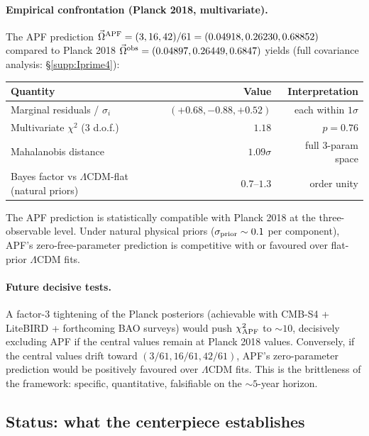 \documentclass[11pt]{article}
\theoremstyle{plain}
\theoremstyle{definition}
\theoremstyle{remark}
\begin{document}
\paragraph{Empirical confrontation (Planck 2018, multivariate).}  The APF prediction $\vec{\Omega}^{\rm APF} = (3, 16, 42)/61 = (0.04918, 0.26230, 0.68852)$ compared to Planck 2018 $\vec{\Omega}^{\rm obs} = (0.04897, 0.26449, 0.6847)$ yields (full covariance analysis: \S\ref{supp:Iprime4}):

\begin{center}
\small
\begin{tabular}{@{}l r r@{}}
\toprule
\textbf{Quantity} & \textbf{Value} & \textbf{Interpretation} \\
\midrule
Marginal residuals / $\sigma_i$ & $(+0.68, -0.88, +0.52)$ & each within $1\sigma$ \\
Multivariate $\chi^2$ (3 d.o.f.) & $1.18$ & $p = 0.76$ \\
Mahalanobis distance & $1.09\sigma$ & full 3-param space \\
Bayes factor vs $\Lambda$CDM-flat (natural priors) & $0.7$--$1.3$ & order unity \\
\bottomrule
\end{tabular}
\end{center}

The APF prediction is statistically compatible with Planck 2018 at the three-observable level.  Under natural physical priors ($\sigma_{\rm prior} \sim 0.1$ per component), APF's zero-free-parameter prediction is competitive with or favoured over flat-prior $\Lambda$CDM fits.

\paragraph{Future decisive tests.}  A factor-3 tightening of the Planck posteriors (achievable with CMB-S4 + LiteBIRD + forthcoming BAO surveys) would push $\chi^2_{\rm APF}$ to $\sim 10$, decisively excluding APF if the central values remain at Planck 2018 values.  Conversely, if the central values drift toward $(3/61, 16/61, 42/61)$, APF's zero-parameter prediction would be positively favoured over $\Lambda$CDM fits.  This is the brittleness of the framework: specific, quantitative, falsifiable on the $\sim 5$-year horizon.

\bigskip

\subsection{Status: what the centerpiece establishes}\label{supp:O_status}
\end{document}
